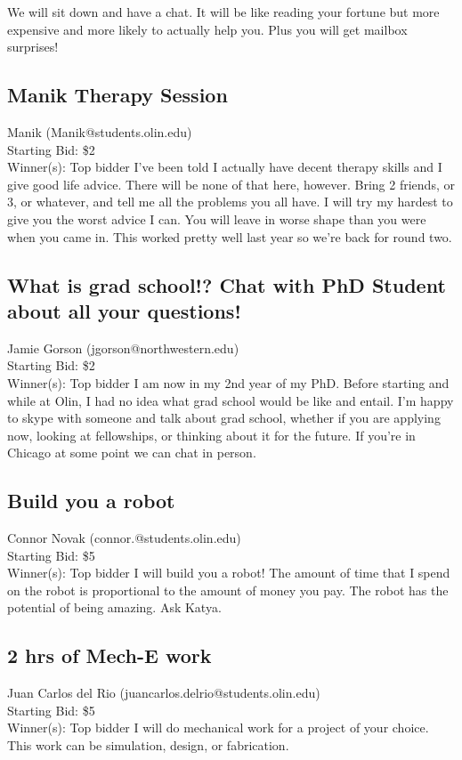 \documentclass[11pt]{article}
\begin{document}
We will sit down and have a chat. It will be like reading your fortune but more expensive and more likely to actually help you. Plus you will get mailbox surprises!
\subsection{Manik Therapy Session}
Manik (Manik@students.olin.edu) \\
Starting Bid: \$2 \\
Winner(s): 
Top bidder\newline
I've been told I actually have decent therapy skills and I give good life advice. There will be none of that here, however. Bring 2 friends, or 3, or whatever, and tell me all the problems you all have. I will try my hardest to give you the worst advice I can. You will leave in worse shape than you were when you came in. This worked pretty well last year so we're back for round two.
\subsection{What is grad school!? Chat with PhD Student about all your questions!}
Jamie Gorson (jgorson@northwestern.edu) \\
Starting Bid: \$2 \\
Winner(s): 
Top bidder\newline
I am now in my 2nd year of my PhD. Before starting and while at Olin, I had no idea what grad school would be like and entail. I'm happy to skype with someone and talk about grad school, whether if you are applying now, looking at fellowships, or thinking about it for the future. If you're in Chicago at some point we can chat in person.
\subsection{Build you a robot}
Connor Novak (connor.@students.olin.edu) \\
Starting Bid: \$5 \\
Winner(s): 
Top bidder\newline
I will build you a robot! The amount of time that I spend on the robot is proportional to the amount of money you pay. The robot has the potential of being amazing. Ask Katya.
\subsection{2 hrs of Mech-E work }
Juan Carlos del Rio (juancarlos.delrio@students.olin.edu) \\
Starting Bid: \$5 \\
Winner(s): 
Top bidder\newline
I will do mechanical work for a project of your choice. This work can be simulation, design, or fabrication.
\end{document}
